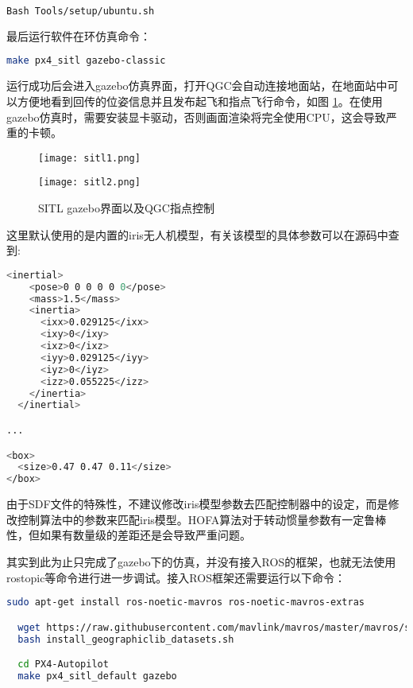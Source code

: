\begin{lstlisting}[language=Bash, basicstyle=\footnotesize, linewidth=\linewidth]
  Bash Tools/setup/ubuntu.sh
\end{lstlisting}

最后运行软件在环仿真命令：

\begin{lstlisting}[language=Bash, basicstyle=\footnotesize, linewidth=\linewidth]
  make px4_sitl gazebo-classic
\end{lstlisting}

运行成功后会进入gazebo仿真界面，打开QGC会自动连接地面站，在地面站中可以方便地看到回传的位姿信息并且发布起飞和指点飞行命令，如图 \ref{sitl}。在使用gazebo仿真时，需要安装显卡驱动，否则画面渲染将完全使用CPU，这会导致严重的卡顿。

\begin{figure}[h]
  \centering
     \begin{minipage}[c]{0.45\textwidth}
      \centering
      \texttt{[image: sitl1.png]}
   \end{minipage}%
     \begin{minipage}[c]{0.45\textwidth}
      \centering
      \texttt{[image: sitl2.png]}
   \end{minipage}
   \caption{SITL gazebo界面以及QGC指点控制}
   \label{sitl}
 \end{figure}

 这里默认使用的是内置的iris无人机模型，有关该模型的具体参数可以在源码\cite{iris}中查到:
 \begin{lstlisting}[language=Bash, basicstyle=\footnotesize, linewidth=\linewidth]
  <inertial>
    <pose>0 0 0 0 0 0</pose>
    <mass>1.5</mass>
    <inertia>
      <ixx>0.029125</ixx>
      <ixy>0</ixy>
      <ixz>0</ixz>
      <iyy>0.029125</iyy>
      <iyz>0</iyz>
      <izz>0.055225</izz>
    </inertia>
  </inertial>

...

<box>
  <size>0.47 0.47 0.11</size>
</box>
 \end{lstlisting}
 
由于SDF文件的特殊性，不建议修改iris模型参数去匹配控制器中的设定，而是修改控制算法中的参数来匹配iris模型。HOFA算法对于转动惯量参数有一定鲁棒性，但如果有数量级的差距还是会导致严重问题。

其实到此为止只完成了gazebo下的仿真，并没有接入ROS的框架，也就无法使用rostopic等命令进行进一步调试。接入ROS框架还需要运行以下命令：

\begin{lstlisting}[language=Bash, basicstyle=\footnotesize, linewidth=\linewidth, breaklines=true]
  sudo apt-get install ros-noetic-mavros ros-noetic-mavros-extras

  wget https://raw.githubusercontent.com/mavlink/mavros/master/mavros/scripts/install_geographiclib_datasets.sh
  bash install_geographiclib_datasets.sh

  cd PX4-Autopilot
  make px4_sitl_default gazebo
\end{lstlisting}

